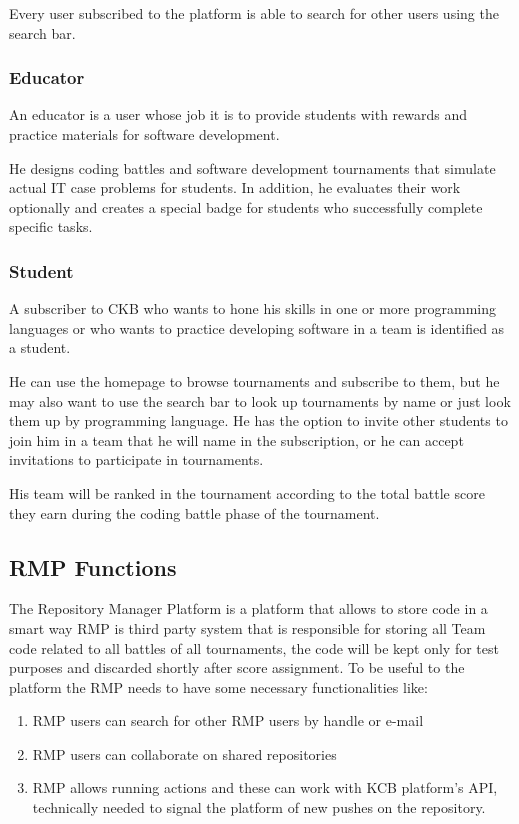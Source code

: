 Every user subscribed to the platform is able to search for other users using the search bar.

\subsubsection{Educator}
An educator is a user whose job it is to provide students with rewards and practice materials for software development.

He designs coding battles and software development tournaments that simulate actual IT case problems for students. In addition, he evaluates their work optionally and creates a special badge for students who successfully complete 
specific tasks.

\subsubsection{Student}
A subscriber to CKB who wants to hone his skills in one or more programming languages or who wants to practice developing software in a team is identified as a student.

He can use the homepage to browse tournaments and subscribe to them, but he may also want to use the search bar to look up tournaments by name or just look them up by programming language. He has the option to invite other students
to join him in a team that he will name in the subscription, or he can accept invitations to participate in tournaments.

His team will be ranked in the tournament according to the total battle score they earn during the coding battle phase of the tournament.

\subsection{RMP Functions}
The Repository Manager Platform is a platform that allows to store code in a smart way
RMP is third party system that is responsible for storing all Team code related to all battles of all tournaments, the code will be kept only for test purposes and discarded shortly after score assignment. 
To be useful to the platform the RMP needs to have some necessary functionalities like:
\begin{enumerate}
    \item RMP users can search for other RMP users by handle or e-mail
    \item RMP users can collaborate on shared repositories
    \item RMP allows running actions and these can work with KCB platform's API, technically needed to signal the platform of new pushes on the repository.
\end{enumerate}


